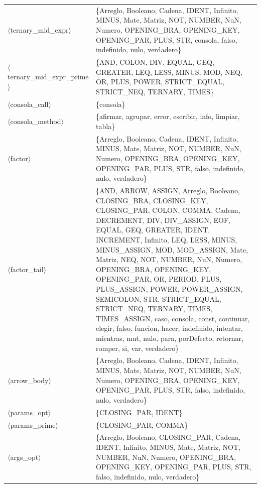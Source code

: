 \documentclass[10pt]{article}
\begin{document}
{\begin{longtable}{@{} p{3.5cm} p{13cm} @{}}
  \parbox[t]{3.3cm}{\raggedright$\langle$ternary\_\allowbreak{}mid\_\allowbreak{}expr$\rangle$} & \{Arreglo, Booleano, Cadena, IDENT, Infinito, MINUS, Mate, Matriz, NOT, NUMBER, NuN, Numero, OPENING\_BRA, OPENING\_KEY, OPENING\_PAR, PLUS, STR, consola, falso, indefinido, nulo, verdadero\} \\
  \parbox[t]{3.3cm}{\raggedright$\langle$ternary\_\allowbreak{}mid\_\allowbreak{}expr\_\allowbreak{}prime$\rangle$} & \{AND, COLON, DIV, EQUAL, GEQ, GREATER, LEQ, LESS, MINUS, MOD, NEQ, OR, PLUS, POWER, STRICT\_EQUAL, STRICT\_NEQ, TERNARY, TIMES\} \\
  \parbox[t]{3.3cm}{\raggedright$\langle$consola\_\allowbreak{}call$\rangle$} & \{consola\} \\
  \parbox[t]{3.3cm}{\raggedright$\langle$consola\_\allowbreak{}method$\rangle$} & \{afirmar, agrupar, error, escribir, info, limpiar, tabla\} \\
  \parbox[t]{3.3cm}{\raggedright$\langle$factor$\rangle$} & \{Arreglo, Booleano, Cadena, IDENT, Infinito, MINUS, Mate, Matriz, NOT, NUMBER, NuN, Numero, OPENING\_BRA, OPENING\_KEY, OPENING\_PAR, PLUS, STR, falso, indefinido, nulo, verdadero\} \\
  \parbox[t]{3.3cm}{\raggedright$\langle$factor\_\allowbreak{}tail$\rangle$} & \{AND, ARROW, ASSIGN, Arreglo, Booleano, CLOSING\_BRA, CLOSING\_KEY, CLOSING\_PAR, COLON, COMMA, Cadena, DECREMENT, DIV, DIV\_ASSIGN, EOF, EQUAL, GEQ, GREATER, IDENT, INCREMENT, Infinito, LEQ, LESS, MINUS, MINUS\_ASSIGN, MOD, MOD\_ASSIGN, Mate, Matriz, NEQ, NOT, NUMBER, NuN, Numero, OPENING\_BRA, OPENING\_KEY, OPENING\_PAR, OR, PERIOD, PLUS, PLUS\_ASSIGN, POWER, POWER\_ASSIGN, SEMICOLON, STR, STRICT\_EQUAL, STRICT\_NEQ, TERNARY, TIMES, TIMES\_ASSIGN, caso, consola, const, continuar, elegir, falso, funcion, hacer, indefinido, intentar, mientras, mut, nulo, para, porDefecto, retornar, romper, si, var, verdadero\} \\
  \parbox[t]{3.3cm}{\raggedright$\langle$arrow\_\allowbreak{}body$\rangle$} & \{Arreglo, Booleano, Cadena, IDENT, Infinito, MINUS, Mate, Matriz, NOT, NUMBER, NuN, Numero, OPENING\_BRA, OPENING\_KEY, OPENING\_PAR, PLUS, STR, falso, indefinido, nulo, verdadero\} \\
  \parbox[t]{3.3cm}{\raggedright$\langle$params\_\allowbreak{}opt$\rangle$} & \{CLOSING\_PAR, IDENT\} \\
  \parbox[t]{3.3cm}{\raggedright$\langle$params\_\allowbreak{}prime$\rangle$} & \{CLOSING\_PAR, COMMA\} \\
  \parbox[t]{3.3cm}{\raggedright$\langle$args\_\allowbreak{}opt$\rangle$} & \{Arreglo, Booleano, CLOSING\_PAR, Cadena, IDENT, Infinito, MINUS, Mate, Matriz, NOT, NUMBER, NuN, Numero, OPENING\_BRA, OPENING\_KEY, OPENING\_PAR, PLUS, STR, falso, indefinido, nulo, verdadero\} \\

\end{longtable}}
\end{document}
